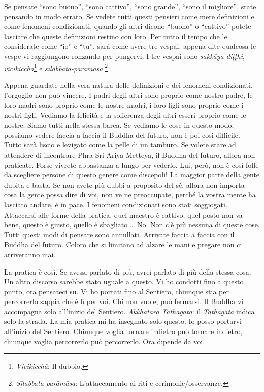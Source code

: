Se pensate ``sono buono'', ``sono cattivo'', ``sono grande'', ``sono il
migliore'', state pensando in modo errato. Se vedete tutti questi
pensieri come mere definizioni e come fenomeni condizionati, quando gli
altri dicono ``buono'' o ``cattivo'' potete lasciare che queste
definizioni restino con loro. Per tutto il tempo che le considerate come
``io'' e ``tu'', sarà come avere tre vespai: appena dite qualcosa le
vespe vi raggiungono ronzando per pungervi. I tre vespai sono
\emph{sakkāya-diṭṭhi}, \emph{vicikicchā}\footnote{\emph{Vicikicchā}: Il
  dubbio.} e \emph{sīlabbata-parāmasā}.\footnote{\emph{Sīlabbata-parāmāsa}:
  L'attaccamento ai riti e cerimonie/osservanze.}

Appena guardate nella vera natura delle definizioni e dei fenomeni
condizionati, l'orgoglio non può vincere. I padri degli altri sono
proprio come nostro padre, le loro madri sono proprio come le nostre
madri, i loro figli sono proprio come i nostri figli. Vediamo la
felicità e la sofferenza degli altri esseri proprio come le nostre.
Siamo tutti nella stessa barca. Se vediamo le cose in questo modo,
possiamo vedere faccia a faccia il Buddha del futuro, non è poi così
difficile. Tutto sarà liscio e levigato come la pelle di un tamburo. Se
volete stare ad attendere di incontrare Phra Sri Ariya Metteya, il
Buddha del futuro, allora non praticate. Forse vivrete abbastanza a
lungo per vederlo. Lui, però, non è così folle da scegliere persone di
questo genere come discepoli! La maggior parte della gente dubita e
basta. Se non avete più dubbi a proposito del sé, allora non importa
cosa la gente possa dire di voi, non ve ne preoccupate, perché la vostra
mente ha lasciato andare, è in pace. I fenomeni condizionati sono stati
soggiogati. Attaccarsi alle forme della pratica, quel maestro è cattivo,
quel posto non va bene, questo è giusto, quello è sbagliato \ldots{} No. Non
c'è più nessuna di queste cose. Tutti questi modi di pensare sono
annullati. Arrivate faccia a faccia con il Buddha del futuro. Coloro che
si limitano ad alzare le mani e pregare non ci arriveranno mai.

La pratica è così. Se avessi parlato di più, avrei parlato di più della
stessa cosa. Un altro discorso sarebbe stato uguale a questo. Vi ho
condotti fino a questo punto, ora pensateci su. Vi ho portati fino al
Sentiero, chiunque stia per percorrerlo sappia che è lì per voi. Chi non
vuole, può fermarsi. Il Buddha vi accompagna solo all'inizio del
Sentiero. \emph{Akkhātaro Tathāgatā}: il \emph{Tathāgatā} indica solo la
strada. La mia pratica mi ha insegnato solo questo. Io posso portarvi
all'inizio del Sentiero. Chiunque voglia tornare indietro può tornare
indietro, chiunque voglia percorrerlo può percorrerlo. Ora dipende da
voi.


